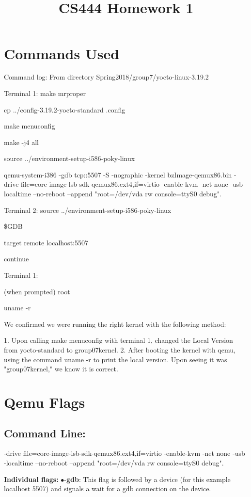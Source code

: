 \documentclass[letterpaper,10pt,fleqn,draftclsnofoot,onecolumn]{IEEEtran}
\title{CS444 Homework 1}
\author{\name}
\begin{document}
	\maketitle
	\hrulefill
	\section*{Commands Used}
	Command log:
	From directory Spring2018/group7/yocto-linux-3.19.2
	
	Terminal 1: 
	make mrproper
	
	cp ../config-3.19.2-yocto-standard .config
	
	make menuconfig
	
	make -j4 all
	
	source ../environment-setup-i586-poky-linux
	
	qemu-system-i386 -gdb tcp::5507 -S -nographic -kernel bzImage-qemux86.bin -drive file=core-image-lsb-sdk-qemux86.ext4,if=virtio -enable-kvm -net none -usb -localtime --no-reboot --append "root=/dev/vda rw console=ttyS0 debug".
	
	
	
	Terminal 2: 
	source ../environment-setup-i586-poky-linux
	
	\$GDB
	
	target remote localhost:5507
	
	continue
	
	Terminal 1: 
	
	(when prompted) root
	
	uname -r
	
	We confirmed we were running the right kernel with the following method:
	
	1. Upon calling make menuconfig with terminal 1, changed the Local Version from yocto-standard to group07kernel. 
	2. After booting the kernel with qemu, using the command uname -r to print the local version. Upon seeing it was "group07kernel," we know it is correct. 
	\section*{Qemu Flags}
	\subsection{Command Line:}
-drive file=core-image-lsb-sdk-qemux86.ext4,if=virtio -enable-kvm -net none -usb -localtime --no-reboot --append "root=/dev/vda rw console=ttyS0 debug".

	{\bf Individual flags:} \newline
	$\bullet$-{\bf gdb}: This flag is followed by a device (for this example localhost 5507) and signals a wait for a gdb connection on the device.
	
\end{document}

